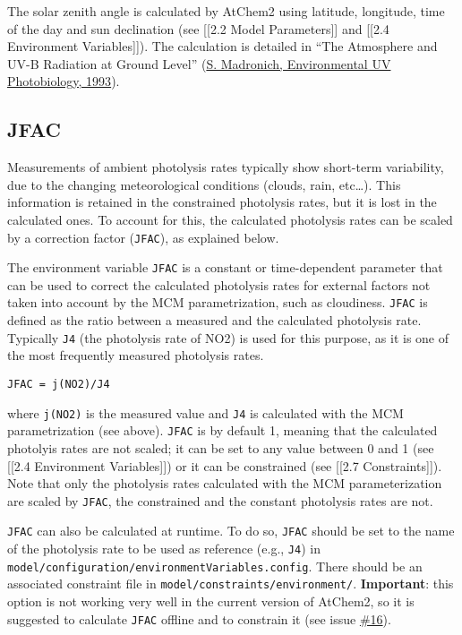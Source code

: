 The solar zenith angle is calculated by AtChem2 using latitude,
longitude, time of the day and sun declination (see {[}{[}2.2 Model
Parameters{]}{]} and {[}{[}2.4 Environment Variables{]}{]}). The
calculation is detailed in ``The Atmosphere and UV-B Radiation at Ground
Level'' (\href{https://doi.org//10.1007/978-1-4899-2406-3_1}{S.
Madronich, Environmental UV Photobiology, 1993}).

\hypertarget{jfac}{%
\subsection{JFAC}\label{jfac}}

Measurements of ambient photolysis rates typically show short-term
variability, due to the changing meteorological conditions (clouds,
rain, etc\ldots{}). This information is retained in the constrained
photolysis rates, but it is lost in the calculated ones. To account for
this, the calculated photolysis rates can be scaled by a correction
factor (\texttt{JFAC}), as explained below.

The environment variable \texttt{JFAC} is a constant or time-dependent
parameter that can be used to correct the calculated photolysis rates
for external factors not taken into account by the MCM parametrization,
such as cloudiness. \texttt{JFAC} is defined as the ratio between a
measured and the calculated photolysis rate. Typically \texttt{J4} (the
photolysis rate of NO2) is used for this purpose, as it is one of the
most frequently measured photolysis rates.

\begin{verbatim}
JFAC = j(NO2)/J4
\end{verbatim}

where \texttt{j(NO2)} is the measured value and \texttt{J4} is
calculated with the MCM parametrization (see above). \texttt{JFAC} is by
default 1, meaning that the calculated photolyis rates are not scaled;
it can be set to any value between 0 and 1 (see {[}{[}2.4 Environment
Variables{]}{]}) or it can be constrained (see {[}{[}2.7
Constraints{]}{]}). Note that only the photolysis rates calculated with
the MCM parameterization are scaled by \texttt{JFAC}, the constrained
and the constant photolysis rates are not.

\texttt{JFAC} can also be calculated at runtime. To do so, \texttt{JFAC}
should be set to the name of the photolysis rate to be used as reference
(e.g., \texttt{J4}) in
\texttt{model/configuration/environmentVariables.config}. There should
be an associated constraint file in
\texttt{model/constraints/environment/}. \textbf{Important}: this option
is not working very well in the current version of AtChem2, so it is
suggested to calculate \texttt{JFAC} offline and to constrain it (see
issue \href{https://github.com/AtChem/AtChem2/issues/16}{\#16}).
